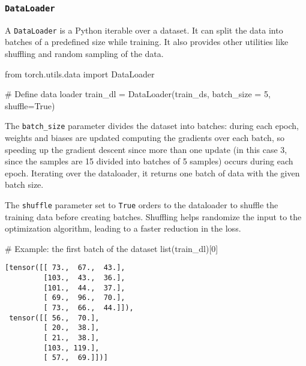 \documentclass[
  letterpaper,
  DIV=11,
  numbers=noendperiod]{scrartcl}
\newenvironment{Shaded}{\begin{snugshade}}{\end{snugshade}}
\newcommand{\BuiltInTok}[1]{\textcolor[rgb]{0.00,0.23,0.31}{#1}}
\newcommand{\CommentTok}[1]{\textcolor[rgb]{0.37,0.37,0.37}{#1}}
\newcommand{\DecValTok}[1]{\textcolor[rgb]{0.68,0.00,0.00}{#1}}
\newcommand{\ImportTok}[1]{\textcolor[rgb]{0.00,0.46,0.62}{#1}}
\newcommand{\NormalTok}[1]{\textcolor[rgb]{0.00,0.23,0.31}{#1}}
\newcommand{\OperatorTok}[1]{\textcolor[rgb]{0.37,0.37,0.37}{#1}}
\newcommand{\VariableTok}[1]{\textcolor[rgb]{0.07,0.07,0.07}{#1}}
\begin{document}
\hypertarget{dataloader}{%
\subsubsection{\texorpdfstring{\texttt{DataLoader}}{DataLoader}}\label{dataloader}}

A \texttt{DataLoader} is a Python iterable over a dataset. It can split
the data into batches of a predefined size while training. It also
provides other utilities like shuffling and random sampling of the data.

\begin{Shaded}
\begin{Highlighting}[]
\ImportTok{from}\NormalTok{ torch.utils.data }\ImportTok{import}\NormalTok{ DataLoader}
\end{Highlighting}
\end{Shaded}

\begin{Shaded}
\begin{Highlighting}[]
\CommentTok{\# Define data loader}
\NormalTok{train\_dl }\OperatorTok{=}\NormalTok{ DataLoader(train\_ds, batch\_size }\OperatorTok{=} \DecValTok{5}\NormalTok{, shuffle}\OperatorTok{=}\VariableTok{True}\NormalTok{)}
\end{Highlighting}
\end{Shaded}

The \texttt{batch\_size} parameter divides the dataset into batches:
during each epoch, weights and biases are updated computing the
gradients over each batch, so speeding up the gradient descent since
more than one update (in this case 3, since the samples are 15 divided
into batches of 5 samples) occurs during each epoch. Iterating over the
dataloader, it returns one batch of data with the given batch size.

The \texttt{shuffle} parameter set to \texttt{True} orders to the
dataloader to shuffle the training data before creating batches.
Shuffling helps randomize the input to the optimization algorithm,
leading to a faster reduction in the loss.

\begin{Shaded}
\begin{Highlighting}[]
\CommentTok{\# Example: the first batch of the dataset}
\BuiltInTok{list}\NormalTok{(train\_dl)[}\DecValTok{0}\NormalTok{]}
\end{Highlighting}
\end{Shaded}

\begin{verbatim}
[tensor([[ 73.,  67.,  43.],
         [103.,  43.,  36.],
         [101.,  44.,  37.],
         [ 69.,  96.,  70.],
         [ 73.,  66.,  44.]]),
 tensor([[ 56.,  70.],
         [ 20.,  38.],
         [ 21.,  38.],
         [103., 119.],
         [ 57.,  69.]])]
\end{verbatim}
\end{document}
